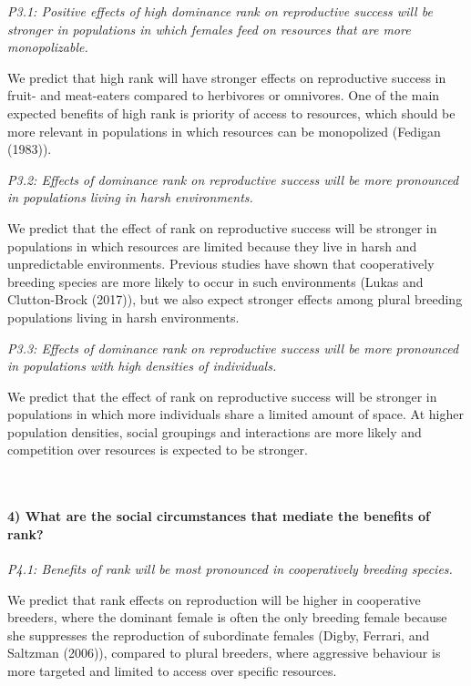 \documentclass[]{article}
\let\oldparagraph\paragraph
\renewcommand{\paragraph}[1]{\oldparagraph{#1}\mbox{}}
\begin{document}
\emph{P3.1: Positive effects of high dominance rank on reproductive
success will be stronger in populations in which females feed on
resources that are more monopolizable.}

We predict that high rank will have stronger effects on reproductive
success in fruit- and meat-eaters compared to herbivores or omnivores.
One of the main expected benefits of high rank is priority of access to
resources, which should be more relevant in populations in which
resources can be monopolized (Fedigan (1983)).

\emph{P3.2: Effects of dominance rank on reproductive success will be
more pronounced in populations living in harsh environments.}

We predict that the effect of rank on reproductive success will be
stronger in populations in which resources are limited because they live
in harsh and unpredictable environments. Previous studies have shown
that cooperatively breeding species are more likely to occur in such
environments (Lukas and Clutton-Brock (2017)), but we also expect
stronger effects among plural breeding populations living in harsh
environments.

\emph{P3.3: Effects of dominance rank on reproductive success will be
more pronounced in populations with high densities of individuals.}

We predict that the effect of rank on reproductive success will be
stronger in populations in which more individuals share a limited amount
of space. At higher population densities, social groupings and
interactions are more likely and competition over resources is expected
to be stronger.

~

\hypertarget{what-are-the-social-circumstances-that-mediate-the-benefits-of-rank-1}{%
\paragraph{\texorpdfstring{\textbf{4) What are the social circumstances
that mediate the benefits of
rank?}}{4) What are the social circumstances that mediate the benefits of rank?}}\label{what-are-the-social-circumstances-that-mediate-the-benefits-of-rank-1}}

\emph{P4.1: Benefits of rank will be most pronounced in cooperatively
breeding species.}

We predict that rank effects on reproduction will be higher in
cooperative breeders, where the dominant female is often the only
breeding female because she suppresses the reproduction of subordinate
females (Digby, Ferrari, and Saltzman (2006)), compared to plural
breeders, where aggressive behaviour is more targeted and limited to
access over specific resources.
\end{document}
